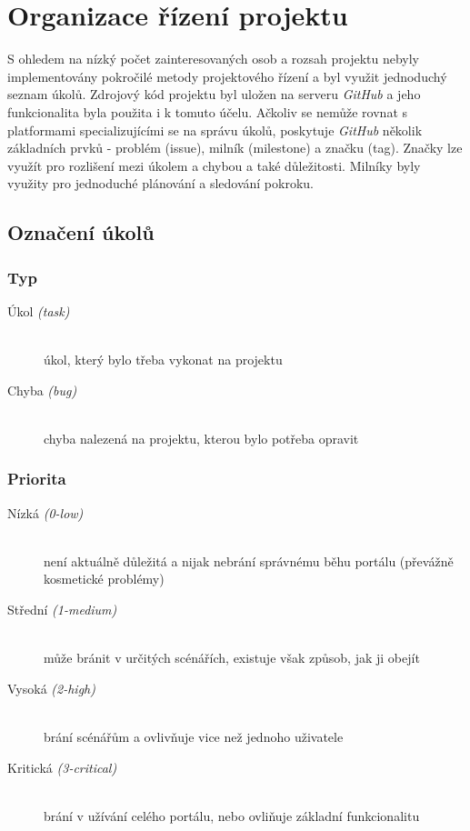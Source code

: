 \section{Organizace řízení projektu}
S ohledem na nízký počet zainteresovaných osob a rozsah projektu nebyly implementovány pokročilé metody projektového řízení a byl využit jednoduchý seznam úkolů. Zdrojový kód projektu  byl uložen na serveru \emph{GitHub} a jeho funkcionalita byla použita i k tomuto účelu. Ačkoliv se nemůže rovnat s platformami specializujícími se na správu úkolů, poskytuje \emph{GitHub} několik základních prvků - problém (issue), milník (milestone) a značku (tag). Značky lze využít pro rozlišení mezi úkolem a chybou a také důležitosti. Milníky byly využity pro jednoduché plánování a sledování pokroku.

\subsection*{Označení úkolů}

\subsubsection*{Typ}
\begin{description}
  \item[Úkol \emph{(task)}] \hfill \\
    úkol, který bylo třeba vykonat na projektu
  \item[Chyba \emph{(bug)}] \hfill \\
    chyba nalezená na projektu, kterou bylo potřeba opravit
\end{description}

\subsubsection*{Priorita}
\begin{description}
	\item[Nízká \emph{(0-low)}] \hfill \\
	  není aktuálně důležitá a nijak nebrání správnému běhu portálu (převážně kosmetické problémy)
	\item[Střední \emph{(1-medium)}] \hfill \\
	  může bránit v určitých scénářích, existuje však způsob, jak ji obejít
	\item[Vysoká  \emph{(2-high)}] \hfill \\
	  brání scénářům a ovlivňuje vice než jednoho uživatele 
	\item[Kritická \emph{(3-critical)}] \hfill \\
	  brání v užívání celého portálu, nebo ovliňuje základní funkcionalitu
\end{description}

